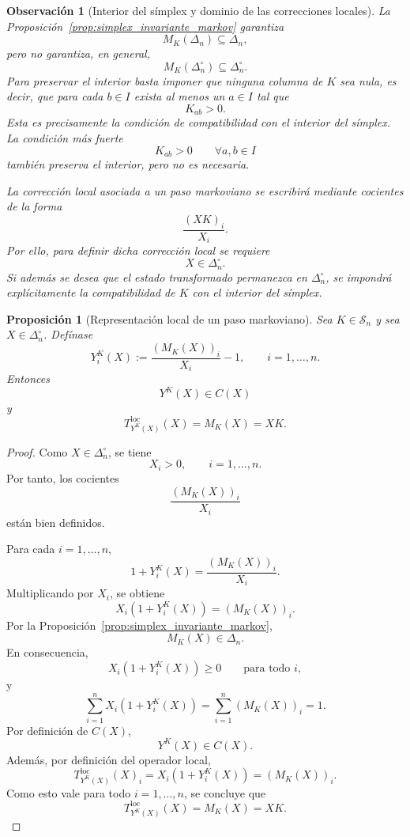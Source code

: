 \documentclass[12pt]{article}
\newtheorem{proposicion}{Proposición}[section]
\newtheorem{observacion}{Observación}[section]
\begin{document}
\begin{observacion}[Interior del símplex y dominio de las correcciones locales]\label{obs:interior_markov}
La Proposición~\ref{prop:simplex_invariante_markov} garantiza
\[
M_K(\Delta_n)\subseteq\Delta_n,
\]
pero no garantiza, en general,
\[
M_K(\Delta_n^\circ)\subseteq\Delta_n^\circ.
\]
Para preservar el interior basta imponer que ninguna columna de \(K\) sea nula, es decir, que para cada \(b\in I\) exista al menos un \(a\in I\) tal que
\[
K_{ab}>0.
\]
Esta es precisamente la condición de compatibilidad con el interior del símplex. La condición más fuerte
\[
K_{ab}>0\qquad\forall a,b\in I
\]
también preserva el interior, pero no es necesaria.

La corrección local asociada a un paso markoviano se escribirá mediante cocientes de la forma
\[
\frac{(XK)_i}{X_i}.
\]
Por ello, para definir dicha corrección local se requiere
\[
X\in\Delta_n^\circ.
\]
Si además se desea que el estado transformado permanezca en \(\Delta_n^\circ\), se impondrá explícitamente la compatibilidad de \(K\) con el interior del símplex.
\end{observacion}

\begin{proposicion}[Representación local de un paso markoviano]\label{prop:markov_como_correccion_local}
Sea \(K\in\mathcal S_n\) y sea \(X\in\Delta_n^\circ\). Defínase
\[
Y^K_i(X):=\frac{(M_K(X))_i}{X_i}-1,
\qquad i=1,\dots,n.
\]
Entonces
\[
Y^K(X)\in C(X)
\]
y
\[
T^{\mathrm{loc}}_{Y^K(X)}(X)=M_K(X)=XK.
\]
\end{proposicion}

\begin{proof}
Como \(X\in\Delta_n^\circ\), se tiene
\[
X_i>0,\qquad i=1,\dots,n.
\]
Por tanto, los cocientes
\[
\frac{(M_K(X))_i}{X_i}
\]
están bien definidos.

Para cada \(i=1,\dots,n\),
\[
1+Y^K_i(X)
=
\frac{(M_K(X))_i}{X_i}.
\]
Multiplicando por \(X_i\), se obtiene
\[
X_i(1+Y^K_i(X))
=
(M_K(X))_i.
\]
Por la Proposición~\ref{prop:simplex_invariante_markov},
\[
M_K(X)\in\Delta_n.
\]
En consecuencia,
\[
X_i(1+Y^K_i(X))\ge 0
\qquad
\text{para todo }i,
\]
y
\[
\sum_{i=1}^n X_i(1+Y^K_i(X))
=
\sum_{i=1}^n (M_K(X))_i
=
1.
\]
Por definición de \(C(X)\),
\[
Y^K(X)\in C(X).
\]
Además, por definición del operador local,
\[
T^{\mathrm{loc}}_{Y^K(X)}(X)_i
=
X_i(1+Y^K_i(X))
=
(M_K(X))_i.
\]
Como esto vale para todo \(i=1,\dots,n\), se concluye que
\[
T^{\mathrm{loc}}_{Y^K(X)}(X)=M_K(X)=XK.
\]
\end{proof}
\end{document}
